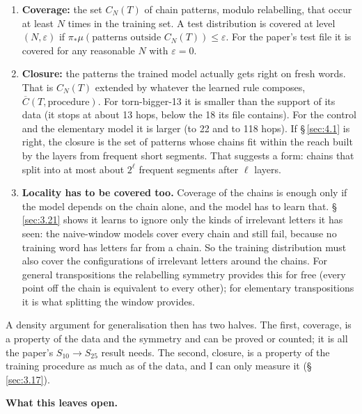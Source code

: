 \documentclass[paper=a4,fontsize=11pt,DIV=11,parskip=half,headings=small,numbers=noendperiod]{scrartcl}
\DeclareRobustCommand{\lead}[1]{\textsf{\bfseries\color{accent}#1}}
\DeclareRobustCommand{\code}[1]{{\fontseries{m}\ttfamily #1}}
\begin{document}
\begin{enumerate}
\item \lead{Coverage:} the set $C_N(T)$ of chain patterns, modulo relabelling, that occur at least $N$ times in
  the training set. A test distribution is covered at level $(N,\varepsilon)$ if $\pi_*\mu(\text{patterns
  outside } C_N(T))\le\varepsilon$. For the paper’s test file it is covered for any reasonable $N$ with
  $\varepsilon=0$.
\item \lead{Closure:} the patterns the trained model actually gets right on fresh words. That is $C_N(T)$
  extended by whatever the learned rule composes, $\overline{C}(T,\text{procedure})$. For
  \code{torn-\allowbreak{}bigger-\allowbreak{}13} it is smaller than the support of its data (it stops at about
  13 hops, below the 18 its file contains). For the control and the elementary model it is larger (to 22 and to
  118 hops). If \S\,\ref{sec:4.1} is right, the closure is the set of patterns whose chains fit within the reach
  built by the layers from frequent short segments. That suggests a form: chains that split into at most about
  $2^{\ell}$ frequent segments after $\ell$ layers.
\item \lead{Locality has to be covered too.} Coverage of the chains is enough only if the model depends on the
  chain alone, and the model has to learn that. \S\,\ref{sec:3.21} shows it learns to ignore only the kinds of
  irrelevant letters it has seen: the naive-window models cover every chain and still fail, because no training
  word has letters far from a chain. So the training distribution must also cover the configurations of
  irrelevant letters around the chains. For general transpositions the relabelling symmetry provides this for
  free (every point off the chain is equivalent to every other); for elementary transpositions it is what
  splitting the window provides.
\end{enumerate}

A density argument for generalisation then has two halves. The first, coverage, is a property of the data and
the symmetry and can be proved or counted; it is all the paper’s $S_{10}\to S_{25}$ result needs. The second,
closure, is a property of the training procedure as much as of the data, and I can only measure it
(\S\,\ref{sec:3.17}).

\lead{What this leaves open.}
\end{document}
